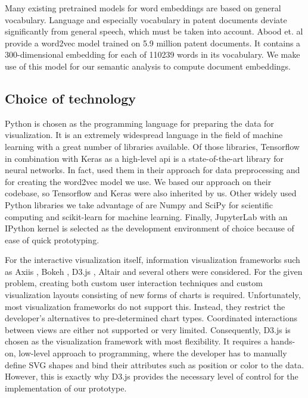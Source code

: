 Many existing pretrained models for word embeddings are based on general vocabulary. 
Language and especially vocabulary in patent documents deviate significantly from general speech, which must be taken into account. 
Abood et. al \cite{Abood2018a} provide a word2vec model trained on 5.9 million patent documents. 
It contains a 300-dimensional embedding for each of 110239 words in its vocabulary.  
We make use of this model for our semantic analysis to compute document embeddings.

\subsection{Choice of technology}
\label{subsec:choice_of_technology}

Python \cite{python} is chosen as the programming language for preparing the data for visualization. 
It is an extremely widespread language in the field of machine learning with a great number of libraries available.
Of those libraries, Tensorflow \cite{tensorflow} in combination with Keras as a high-level \gls{api} \cite{keras} is a state-of-the-art library for neural networks. 
In fact, \cite{Abood2018a} used them in their approach for data preprocessing and for creating the word2vec model we use.
We based our approach on their codebase, so Tensorflow and Keras were also inherited by us.
Other widely used Python libraries we take advantage of are Numpy \cite{numpy} and SciPy \cite{scipy} for scientific computing and scikit-learn for machine learning.
Finally, JupyterLab \cite{jupyterlab} with an IPython \cite{ipython} kernel is selected as the development environment of choice because of ease of quick prototyping.

For the interactive visualization itself, information visualization frameworks such as Axiis \cite{axiis}, Bokeh  \cite{bokeh}, D3.js \cite{Bostock2019}, Altair \cite{altair}  and several others were considered. 
For the given problem, creating both custom user interaction techniques and custom visualization layouts consisting of new forms of charts is required. 
Unfortunately, most visualization frameworks do not support this.
Instead, they restrict the developer's alternatives to pre-determined chart types.
Coordinated interactions between views are either not supported or very limited.
Consequently, D3.js is chosen as the visualization framework with most flexibility.
It requires a hands-on, low-level approach to programming, where the developer has to manually define SVG shapes and bind their attributes such as position or color to the data.
However, this is exactly why D3.js provides the necessary level of control for the implementation of our prototype.

